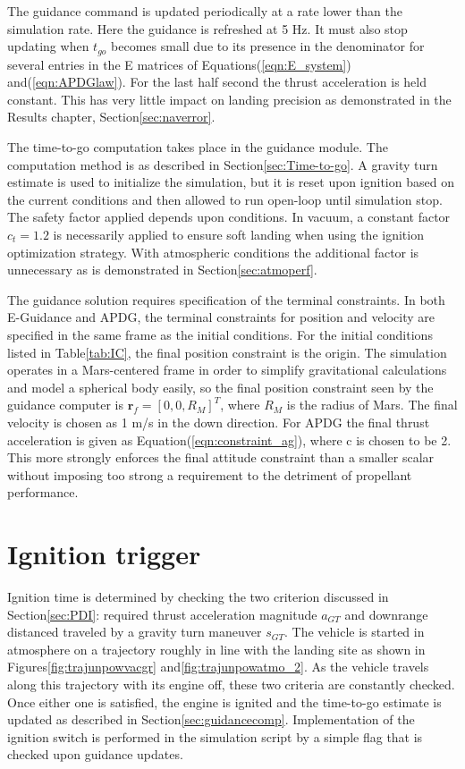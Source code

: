 The guidance command is updated periodically at a rate lower than the simulation rate. Here the guidance is refreshed at 5 Hz. It must also stop updating when $t_{go}$ becomes small due to its presence in the denominator for several entries in the E matrices of Equations\:(\ref{eqn:E_system}) and\:(\ref{eqn:APDGlaw}). For the last half second the thrust acceleration is held constant. This has very little impact on landing precision as demonstrated in the Results chapter, Section\:\ref{sec:naverror}.

The time-to-go computation takes place in the guidance module. The computation method is as described in Section\:\ref{sec:Time-to-go}. A gravity turn estimate is used to initialize the simulation, but it is reset upon ignition based on the current conditions and then allowed to run open-loop until simulation stop. The safety factor applied depends upon conditions. In vacuum, a constant factor $c_t = 1.2$ is necessarily applied to ensure soft landing when using the ignition optimization strategy. With atmospheric conditions the additional factor is unnecessary as is demonstrated in Section\:\ref{sec:atmoperf}.

The guidance solution requires specification of the terminal constraints. In both E-Guidance and APDG, the terminal constraints for position and velocity are specified in the same frame as the initial conditions. For the initial conditions listed in Table\:\ref{tab:IC}, the final position constraint is the origin. The simulation operates in a Mars-centered frame in order to simplify gravitational calculations and model a spherical body easily, so the final position constraint seen by the guidance computer is $\bm{r}_f = [0,0,R_M]^T$, where $R_M$ is the radius of Mars. The final velocity is chosen as 1 m/s in the down direction. For APDG the final thrust acceleration is given as Equation\:(\ref{eqn:constraint_ag}), where c is chosen to be 2. This more strongly enforces the final attitude constraint than a smaller scalar without imposing too strong a requirement to the detriment of propellant performance.

\section{Ignition trigger}
Ignition time is determined by checking the two criterion discussed in Section\:\ref{sec:PDI}: required thrust acceleration magnitude $a_{GT}$ and downrange distanced traveled by a gravity turn maneuver $s_{GT}$. The vehicle is started in atmosphere on a trajectory roughly in line with the landing site as shown in Figures\:\ref{fig:trajunpowvacgr} and\:\ref{fig:trajunpowatmo_2}. As the vehicle travels along this trajectory with its engine off, these two criteria are constantly checked. Once either one is satisfied, the engine is ignited and the time-to-go estimate is updated as described in Section\:\ref{sec:guidancecomp}. Implementation of the ignition switch is performed in the simulation script by a simple flag that is checked upon guidance updates.

